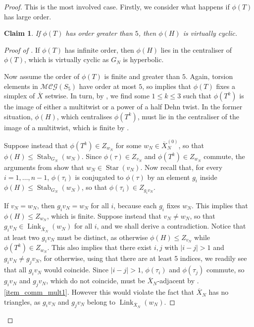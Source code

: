 \documentclass[svgnames]{amsart}
\theoremstyle{plain}
\newtheorem{claim}[thm]{Claim}
\newenvironment{claimproof}{\renewcommand{\qedsymbol}{$\blacksquare$}\begin{proof}}{\end{proof}}
\theoremstyle{definition}
\newcommand{\link}[2]{\operatorname{Link}_{#1}\left(#2\right)}
\newcommand{\CStar}[1]{\operatorname{Star}\left(#1\right)}
\newcommand{\MCG}{\mathcal{MCG}}
\newcommand{\Stab}[2]{\operatorname{Stab}_{#1}\left(#2\right)}
\newcommand{\ov}[1]{\overline{#1}}
\begin{document}
\begin{proof}
This is the most involved case. Firstly, we consider what happens if $\phi(T)$ has large order.
    \begin{claim}\label{claim:phiT}
        If $\phi(T)$ has order greater than $5$, then $\phi(H)$ is virtually cyclic.
    \end{claim}
    \begin{claimproof}[Proof of ]
        If $\phi(T)$ has infinite order, then $\phi(H)$ lies in the centraliser of $\phi(T)$, which is virtually cyclic as $G_N$ is hyperbolic.

        Now assume the order of $\phi(T)$ is finite and greater than $5$. Again, torsion elements in $\MCG(S_5)$ have order at most $5$, so  implies that $\phi(T)$ fixes a simplex of $\ov X$ setwise. In turn, by , we find some $1\le k\le 3$ such that $\phi(T^k)$ is the image of either a multitwist or a power of a half Dehn twist. In the former situation, $\phi(H)$, which centralises $\phi(T^k)$, must lie in the centraliser of the image of a multitwist, which is finite by . 
        
        Suppose instead that $\phi(T^k)\in Z_{w_N}$ for some $w_N\in \ov X_N^{(0)}$, so that $\phi(H)\le \Stab{G_N}{w_N}$. Since $\phi(\tau)\in Z_{v_N}$ and $\phi(T^k)\in Z_{w_N}$ commute, the arguments from  show that $w_N\in \CStar{v_N}$. Now recall that, for every $i=1,\ldots, n-1$, $\phi(\tau_i)$ is conjugated to $\phi(\tau)$ by an element $g_i$ inside $\phi(H)\le \Stab{G_N}{w_N}$, so that $\phi(\tau_i)\in Z_{g_iv_N}$. 
        
        If $v_N=w_N$, then $g_iv_N=w_N$ for all $i$, because each $g_i$ fixes $w_N$. This implies that $\phi(H)\le Z_{w_N}$, which is finite. Suppose instead that $v_N\neq w_N$, so that $g_iv_N\in\link{\ov X_N}{w_N} $ for all $i$, and we shall derive a contradiction. Notice that at least two $g_iv_N$ must be distinct, as otherwise $\phi(H)\le Z_{v_N}$ while $\phi(T^k)\in Z_{w_N}$. This also implies that there exist $i,j$ with $|i-j|>1$ and $g_iv_N\neq g_{j}v_N$, for otherwise, using that there are at least 5 indices, we readily see that all $g_iv_N$ would coincide. Since $|i-j|>1$, $\phi(\tau_i)$ and $\phi(\tau_j)$ commute, so $g_iv_N$ and $g_jv_N$, which do not coincide, must be $\ov X_N$-adjacent by .\eqref{item_comm_mult1}. However this would violate the fact that $\ov X_N$ has no triangles, as $g_iv_N$ and $g_jv_N$ belong to $\link{\ov X_N}{w_N}$.
    \end{claimproof}


\end{proof}
\end{document}
